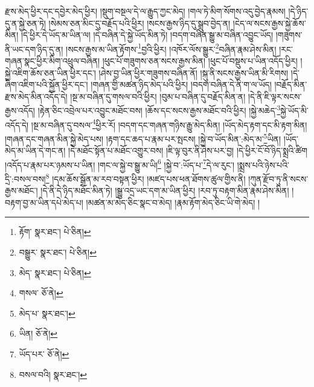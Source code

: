 རྫས་མེད་ཕྱིར་དང་དབྱེར་མེད་ཕྱིར། །སྡུག་བསྔལ་དེ་ལ་རྒྱུད་ཀྱང་མེད། །གལ་ཏེ་མིག་སོགས་འདུ་བྱེད་རྣམས། །དེ་ཉིད་དུ་ན་སྐྱེ་ཅན་ཏེ། །སེམས་ཅན་མིང་དུ་བརྗོད་པའི་ཕྱིར། །སངས་རྒྱས་ཉིད་དུ་སྒྲུབ་བྱེད་ན། །ངེད་ལ་སངས་རྒྱས་སྐྱེ་ཆོས་མིན། །དེ་ཕྱིར་དེ་ཡོད་མ་ཡིན་ལ། །དེ་བཞིན་དེ་སྐྱེ་ཡོད་མིན་ཏེ། །བདག་བཞིན་སྒྱུ་མ་བཞིན་འབྱུང་ཡོད། །གཟུགས་ནི་ཡང་དག་ཉིད་དུ་ན། །སངས་རྒྱས་མ་ཡིན་རྟོགས་\footnote{རྟོག་  སྣར་ཐང་།  པེ་ཅིན། }བྱའི་ཕྱིར། །འཁོར་ལོས་སྒྱུར་\footnote{བསྒྱུར་  སྣར་ཐང་།  པེ་ཅིན། }བཞིན་རྣམ་ཤེས་མིན། །རང་གཞན་སྣང་ཕྱིར་མིག་འཕྲུལ་བཞིན། །ཕུང་པོ་གཟུགས་ཅན་སངས་རྒྱས་མིན། །ཕུང་པོ་བསྡུས་པ་ཡིན་འདོད་ཕྱིར། །སྐྱེ་འཇིག་ཆོས་ཅན་ཡིན་ཕྱིར་དང་། །ཤེས་བྱ་ཡིན་ཕྱིར་གཟུགས་བཞིན་ནོ། །སྐུ་ནི་སངས་རྒྱས་ཡིན་མི་རིགས། །དེ་ཞིག་འཇིག་པའི་སྐྱོན་ཕྱིར་དང་། །གཞན་གྱི་མཚན་ཉིད་མེད་པའི་ཕྱིར། །བདག་བཞིན་དེ་ནི་ག་ལ་ཡོད། །བརྗོད་མིན་རྫས་མེད་མིན་འདོད་དེ། །སྔ་མ་བཞིན་དུ་གསལ་བའི་ཕྱིར། །བུམ་པ་བཞིན་དུ་བརྗོད་མིན་ན། །དེ་ནི་ཇི་ལྟར་སངས་རྒྱས་འདོད། །རྟེན་ཅིང་འབྲེལ་པར་འབྱུང་མཐོང་བས། །ཆོས་དང་སངས་རྒྱས་མཐོང་བའི་ཕྱིར། །སྐྱེ་མཆེད་\footnote{མེད་  སྣར་ཐང་།  པེ་ཅིན། }སྐྱེ་ཡོད་མི་འདོད་དེ། །སྔ་མ་བཞིན་དུ་བསལ་\footnote{གསལ་  ཅོ་ནེ། }ཕྱིར་རོ། །བདག་དང་གཞན་གཉིས་རྒྱུ་མེད་མིན། །ཡོད་མེད་རྟག་དང་མི་རྟག་མིན། །གཞན་དང་གཞན་མིན་སྐྱེ་མེད་པས། །རྟག་དང་ཆད་པ་རྣམ་པར་སྤངས། །སྐྱེ་བ་ཡོད་མིན་:མེད་མ་\footnote{མེད་པ་  སྣར་ཐང་། }ཡིན། །ཡོད་མེད་མ་ཡིན་དེ་གང་ན། །དེ་མཐོང་སྟོན་པ་མཐོང་འགྱུར་བས། །ཇི་ལྟ་བུར་ནི་ཤེས་པར་བྱ། །དེ་ཕྱིར་ངོ་བོ་ཉིད་སྨྲའི་ཚིག །འདོད་པ་རྣམ་པར་ཉམས་པ་ཡིན། །གང་ལ་སྐྱེ་བ་སྒྱུ་མ་ཡི།\footnote{ཡིན།  ཅོ་ནེ། } །སྐྱེ་བ་:ཡོད་པ་\footnote{ཡོད་པར་  ཅོ་ནེ། }དེ་ལ་རུང་། །སྨྲས་པའི་ཉེས་པའི་དྲི་:བསལ་བས།\footnote{བསལ་བའི།  སྣར་ཐང་། } །དམ་ཆོས་སྒྲོན་མ་རབ་བསྟན་ཕྱིར། །མཛད་པས་ཕན་ཐོགས་ཚུལ་གྱིས་ནི། །ཀུན་རྫོབ་ཏུ་ནི་སངས་རྒྱས་མཐོང་། །དེ་ནི་དེ་ཉིད་མཐོང་མིན་ཏེ། །སྒྱུ་འདྲ་ཡང་དག་མ་ཡིན་ཕྱིར། །རབ་ཏུ་བརྟག་མིན་རྣམ་ཤེས་མིན། །བརྟག་བྱ་མ་ཡིན་དཔེ་མེད་པ། །མཚན་མ་མེད་ཅིང་སྣང་བ་མེད། །རྣམ་རྟོག་མེད་ཅིང་ཡི་གེ་མེད། །
